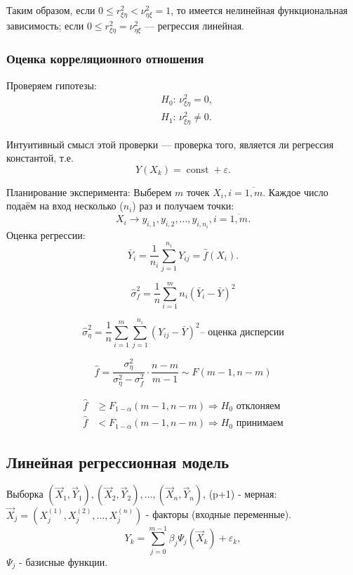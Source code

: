 Таким образом, если $0 \leqslant r_{\xi\eta}^2 < \nu_{\eta \xi}^2 = 1$, то имеется нелинейная
функциональная зависимость; если $0 \leqslant r_{\xi\eta}^2 = \nu_{\eta\xi}^2$ --- регрессия
линейная.

\subsubsection{Оценка корреляционного отношения}
Проверяем гипотезы:
\begin{align*}
  &H_0\text{: } \nu_{\xi\eta}^2 = 0, \\
  &H_1\text{: } \nu_{\xi\eta}^2 \neq 0.
\end{align*}

Интуитивный смысл этой проверки --- проверка того, является ли регрессия константой, т.е.
\[
  Y(X_k) = \operatorname{const} + \varepsilon.
\]

Планирование эксперимента:
Выберем $m$ точек $X_i, i=\overline{1, m}$. Каждое число подаём на вход несколько ($n_i$) раз и
получаем точки:
\[
  X_i \rightarrow y_{i,1}, y_{i,2}, \dots, y_{i, n_i}, i = \overline{1, m}.
\]
Оценка регрессии:
\[
  \bar Y_i = \frac{1}{n_i} \sum_{j=1}^{n_i} Y_{ij} = \hat f(X_i).
\]


\[
  \hat\sigma_f^2 = \frac{1}{n} \sum_{i=1}^m n_i (\bar Y_i - \bar Y)^2
  \]

\[
  \hat\sigma_\eta^2 = \frac{1}{n} \sum_{i=1}^m \sum_{j=1}^{n_i} (Y_{ij} - \bar Y)^2
  \text{-- оценка дисперсии}
\]

\[
  \hat f = \frac{\sigma_\eta^2}{\sigma_\eta^2 - \sigma_f^2} \cdot \frac{n-m}{m-1}
  \sim F(m-1, n-m)
\]

\begin{align*}
  \hat f &\geqslant F_{1-\alpha} (m-1, n-m) \Rightarrow \text{$H_0$ отклоняем} \\
  \hat f &< F_{1-\alpha} (m-1, n-m) \Rightarrow \text{$H_0$ принимаем}
\end{align*}

\subsection{Линейная регрессионная модель}

Выборка $(\vec{X}_1, \vec{Y}_1), (\vec{X}_2, \vec{Y}_2), \dots, (\vec{X}_n, \vec{Y}_n)$, 
(p+1) - мерная: $\vec{X}_j = (X_j^{(1)}, X_j^{(2)}, \dots, X_j^{(n)})$ - факторы (входные переменные).
\[
  Y_k = \sum_{j=0}^{m-1} \beta_j \Psi_j(\vec{X}_k) + \varepsilon_k,
\]
$\Psi_j$ - базисные функции.

